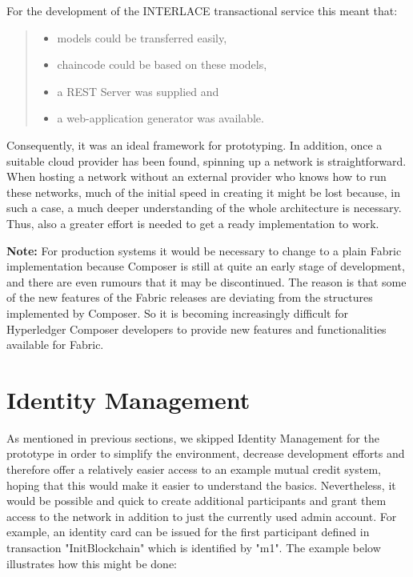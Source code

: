 For the development of the INTERLACE transactional service this meant that:
\begin{quote}
\begin{itemize}
	\item models could be transferred easily,
	\item chaincode could be based on these models,
	\item a REST Server was supplied and
	\item a web-application generator was available.
\end{itemize}
\end{quote}

Consequently, it was an ideal framework for prototyping. In addition, once a suitable cloud provider has been found, spinning up a network is straightforward. When hosting a network without an external provider who knows how to run these networks, much of the initial speed in creating it might be lost because, in such a case, a much deeper understanding of the whole architecture is necessary. Thus, also a greater effort is needed to get a ready implementation to work.

\textbf{Note:} For production systems it would be necessary to change to a plain Fabric implementation because Composer is still at quite an early stage of development, and there are even rumours that it may be discontinued. The reason is that some of the new features of the Fabric releases are deviating from the structures implemented by Composer. So it is becoming increasingly difficult for Hyperledger Composer developers to provide new features and functionalities available for Fabric.

\section{Identity Management}
\label{sec:id-management}

As mentioned in previous sections, we skipped Identity Management for the prototype in order to simplify the environment, decrease development efforts and therefore offer a relatively easier access to an example mutual credit system, hoping that this would make it easier to understand the basics. Nevertheless, it would be possible and quick to create additional participants and grant them access to the network in addition to just the currently used admin account. For example, an identity card can be issued for the first participant defined in transaction "InitBlockchain" which is identified by "m1". The example below illustrates how this might be done:

